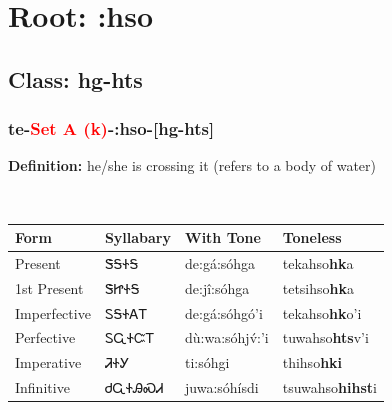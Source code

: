 \needspace{4in}
\section*{Root: :hso}
\nopagebreak
{}
\needspace{3in}
\subsection*{Class: hg-hts}
\nopagebreak
\needspace{2in}
\subsubsection*{te{-}\textcolor{Red}{Set A (k)}{-}\textbf{:hso}{-}[hg-hts]}
\nopagebreak
\textbf{Definition: } he/she is crossing it (refers to a body of water)
\\[0.5em]
\begin{tabularx}{\textwidth}{l X X X}%
\toprule%
\textbf{Form}&\textbf{Syllabary}&\textbf{With Tone}&\textbf{Toneless}\\%
\midrule%
Present&ᏕᎦᏐᎦ&de:gá:sóhga&tekahso\textbf{hk}a\\%
1st Present&ᏕᏥᏐᎦ&de:jî:sóhga&tetsihso\textbf{hk}a\\%
Imperfective&ᏚᎦᏐᎪᎢ&de:gá:sóhgó’i&tekahso\textbf{hk}o'i\\%
Perfective&ᏚᏩᏐᏨᎢ&dù:wa:sóhjv́:’i&tuwahso\textbf{hts}v'i\\%
Imperative&ᏘᏐᎩ&ti:sóhgi&thihso\textbf{hki}\\%
Infinitive&ᏧᏩᏐᎯᏍᏗ&juwa:sóhísdi&tsuwahso\textbf{hihst}i\\%
\bottomrule%
\end{tabularx}
\\[1em]